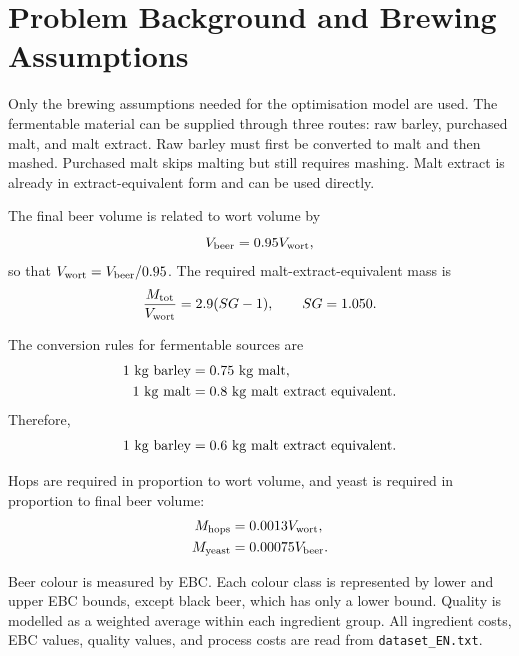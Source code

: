 \section{Problem Background and Brewing Assumptions}
\label{sec:background}

Only the brewing assumptions needed for the optimisation model are used. The fermentable material can be supplied through three routes: raw barley, purchased malt, and malt extract. Raw barley must first be converted to malt and then mashed. Purchased malt skips malting but still requires mashing. Malt extract is already in extract-equivalent form and can be used directly.

The final beer volume is related to wort volume by
\begin{equation}
  V_{\mathrm{beer}} = 0.95V_{\mathrm{wort}},
  \label{eq:beer-wort}
\end{equation}
so that $V_{\mathrm{wort}}=V_{\mathrm{beer}}/0.95$. The required malt-extract-equivalent mass is
\begin{equation}
  \frac{M_{\mathrm{tot}}}{V_{\mathrm{wort}}}=2.9(SG-1), \qquad SG=1.050.
  \label{eq:extract-ratio}
\end{equation}

The conversion rules for fermentable sources are
\begin{align}
  1~\kg\ \mathrm{barley} &= 0.75~\kg\ \mathrm{malt}, \label{eq:barley-to-malt}\\
  1~\kg\ \mathrm{malt} &= 0.8~\kg\ \mathrm{malt\ extract\ equivalent}. \label{eq:malt-to-extract}
\end{align}
Therefore,
\begin{equation}
  1~\kg\ \mathrm{barley}=0.6~\kg\ \mathrm{malt\ extract\ equivalent}.
  \label{eq:barley-to-extract}
\end{equation}

Hops are required in proportion to wort volume, and yeast is required in proportion to final beer volume:
\begin{align}
  M_{\mathrm{hops}} &= 0.0013V_{\mathrm{wort}}, \label{eq:hops}\\
  M_{\mathrm{yeast}} &= 0.00075V_{\mathrm{beer}}. \label{eq:yeast}
\end{align}

Beer colour is measured by EBC. Each colour class is represented by lower and upper EBC bounds, except black beer, which has only a lower bound. Quality is modelled as a weighted average within each ingredient group. All ingredient costs, EBC values, quality values, and process costs are read from \texttt{dataset\_EN.txt}.